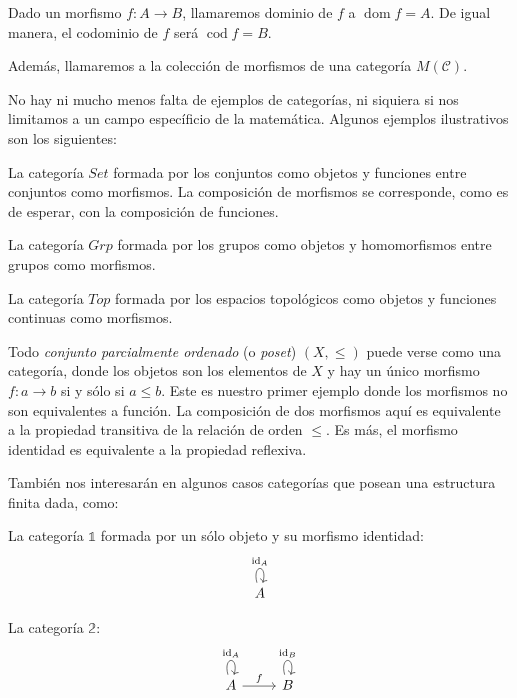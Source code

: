 \documentclass[12pt, twoside]{book}
\newcommand{\newterm}[1]{\index{#1}\emph{#1}}
\newcommand{\cat}{{\mathcal{C}}}
\newcommand{\Set}{{Set}}
\newcommand{\Grp}{{Grp}}
\newcommand{\Top}{{Top}}
\DeclareMathOperator{\dom}{dom}
\DeclareMathOperator{\cod}{cod}
\DeclareMathOperator{\id}{id}
\begin{document}
Dado un morfismo $f \colon A \to B$, llamaremos dominio de $f$ a $\dom f = A$.
De igual manera, el codominio de $f$ será $\cod f = B$.

Además, llamaremos a la colección de morfismos de una categoría $M(\cat)$.

No hay ni mucho menos falta de ejemplos de categorías, ni siquiera si nos limitamos a un campo específicio de la matemática.
Algunos ejemplos ilustrativos son los siguientes:

\begin{example}
La categoría $\Set$ formada por los conjuntos como objetos y funciones entre conjuntos como morfismos.
La composición de morfismos se corresponde, como es de esperar, con la composición de funciones.
\end{example}

\begin{example}
La categoría $\Grp$ formada por los grupos como objetos y homomorfismos entre grupos como morfismos.
\end{example}

\begin{example}
La categoría $\Top$ formada por los espacios topológicos como objetos y funciones continuas como morfismos.
\end{example}

\begin{example}
Todo \newterm{conjunto parcialmente ordenado} (o \emph{poset}) $(X,\leq)$ puede verse como una categoría, donde los objetos son los elementos de $X$ y hay un único morfismo $f \colon a \to b$ si y sólo si $a \leq b$.
Este es nuestro primer ejemplo donde los morfismos no son equivalentes a función.
La composición de dos morfismos aquí es equivalente a la propiedad transitiva de la relación de orden $\leq$.
Es más, el morfismo identidad es equivalente a la propiedad reflexiva.
\end{example}

También nos interesarán en algunos casos categorías que posean una estructura finita dada, como:
\begin{example}
La categoría $\mathbb{1}$ formada por un sólo objeto y su morfismo identidad:
\[ \begin{tikzcd}
A \arrow[loop above,"\id_A"]
\end{tikzcd}\]
\end{example}

\begin{example}
La categoría $\mathbb{2}$:
\[ \begin{tikzcd}
A \arrow[loop above,"\id_A"] \arrow[r,"f"] & B \arrow[loop above,"\id_B"]
\end{tikzcd}\]
\end{example}
\end{document}
